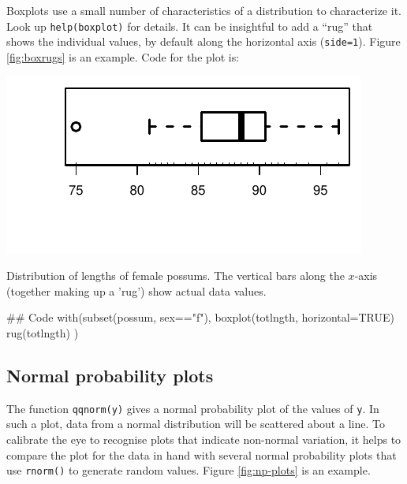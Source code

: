 \documentclass{tufte-book}\usepackage[]{graphicx}\usepackage[]{color}
\newcommand{\txtt}[1]{\texttt{#1}}
\begin{document}
Boxplots use a small number of characteristics of a distribution to
characterize it. Look up \txtt{help(boxplot)} for details.
It can be insightful to add a ``rug'' that shows the individual values,
by default along the horizontal axis (\txtt{side=1}).
Figure \ref{fig:boxrugs} is an example.  Code for the plot is:
\begin{marginfigure}
\begin{Schunk}


\centerline{\includegraphics[width=\textwidth]{figs/09-boxplot-1} }

\end{Schunk}
\vspace*{-12pt}

\caption{Distribution of lengths of female possums.  The 
 vertical bars along the $x$-axis (together making up a 'rug')
 show actual data values.\label{fig:boxrugs}}
\end{marginfigure}

\begin{Schunk}
\begin{Sinput}
## Code
with(subset(possum, sex=="f"),
     {boxplot(totlngth, horizontal=TRUE)
      rug(totlngth)} )
\end{Sinput}
\end{Schunk}

\subsection*{Normal probability plots}

The function \txtt{qqnorm(y)} gives a normal probability plot of the
values of \txtt{y}. In such a plot, data from a normal distribution
will be scattered about a line.  To calibrate the eye to recognise
plots that indicate non-normal variation, it helps to compare the plot
for the data in hand with several normal probability plots that use
\txtt{rnorm()} to generate random values.  Figure \ref{fig:np-plots}
is an example.
\end{document}
